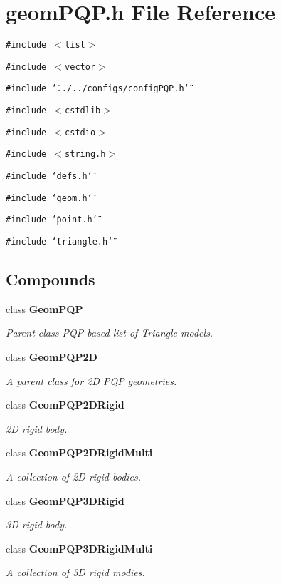 \section{geom\-PQP.h File Reference}
\label{geomPQP_8h}
{\tt \#include $<$list$>$}\par
{\tt \#include $<$vector$>$}\par
{\tt \#include \char`\"{}../../configs/config\-PQP.h\char`\"{}}\par
{\tt \#include $<$cstdlib$>$}\par
{\tt \#include $<$cstdio$>$}\par
{\tt \#include $<$string.h$>$}\par
{\tt \#include \char`\"{}defs.h\char`\"{}}\par
{\tt \#include \char`\"{}geom.h\char`\"{}}\par
{\tt \#include \char`\"{}point.h\char`\"{}}\par
{\tt \#include \char`\"{}triangle.h\char`\"{}}\par
\subsection*{Compounds}
\begin{CompactItemize}
\item 
class {\bf Geom\-PQP}
\begin{CompactList}\small\item\em Parent class PQP-based list of Triangle models.\item\end{CompactList}\item 
class {\bf Geom\-PQP2D}
\begin{CompactList}\small\item\em A parent class for 2D PQP geometries.\item\end{CompactList}\item 
class {\bf Geom\-PQP2DRigid}
\begin{CompactList}\small\item\em 2D rigid body.\item\end{CompactList}\item 
class {\bf Geom\-PQP2DRigid\-Multi}
\begin{CompactList}\small\item\em A collection of 2D rigid bodies.\item\end{CompactList}\item 
class {\bf Geom\-PQP3DRigid}
\begin{CompactList}\small\item\em 3D rigid body.\item\end{CompactList}\item 
class {\bf Geom\-PQP3DRigid\-Multi}
\begin{CompactList}\small\item\em A collection of 3D rigid modies.\item\end{CompactList}\end{CompactItemize}
